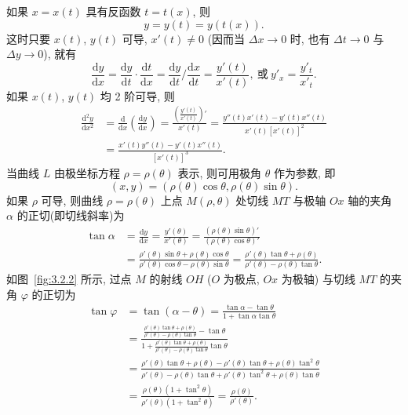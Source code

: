如果 $x = x(t)$ 具有反函数 $t = t(x)$, 则
\[
y = y(t) = y(t(x)).
\]
这时只要 $x(t)$, $y(t)$ 可导, $x'(t) \neq 0$ (因而当 $\Delta x \to 0$ 时, 也有 $\Delta t \to 0$ 与 $\Delta y \to 0$), 就有
\[
\frac{\mathrm{d}y}{\mathrm{d}x} = \frac{\mathrm{d}y}{\mathrm{d}t}\cdot\frac{\mathrm{d}t}{\mathrm{d}x} = \frac{\mathrm{d}y}{\mathrm{d}t}\bigg/\frac{\mathrm{d}x}{\mathrm{d}t} = \frac{y'(t)}{x'(t)},\ \text{或}\ y'_{x} = \frac{y'_{t}}{x'_{t}}.
\]
如果 $x(t)$, $y(t)$ 均 2 阶可导, 则
\[
\begin{aligned}
\frac{\mathrm{d}^{2}y}{\mathrm{d}x^{2}} &= \frac{\mathrm{d}}{\mathrm{d}x}\left(\frac{\mathrm{d}y}{\mathrm{d}x}\right) = \frac{\left(\frac{y'(t)}{x'(t)}\right)'}{x'(t)} = \frac{y''(t)x'(t) - y'(t)x''(t)}{x'(t)[x'(t)]^{2}}\\
&= \frac{x'(t)y''(t) - y'(t)x''(t)}{[x'(t)]^{3}}.
\end{aligned}
\]
当曲线 $L$ 由极坐标方程 $\rho = \rho(\theta)$ 表示, 则可用极角 $\theta$ 作为参数, 即
\[
(x, y) = (\rho(\theta)\cos\theta, \rho(\theta)\sin\theta).
\]
如果 $\rho$ 可导, 则曲线 $\rho = \rho(\theta)$ 上点 $M(\rho, \theta)$ 处切线 $MT$ 与极轴 $Ox$ 轴的夹角 $\alpha$ 的正切(即切线斜率)为
\[
\begin{aligned}
\tan\alpha &= \frac{\mathrm{d}y}{\mathrm{d}x} = \frac{y'(\theta)}{x'(\theta)} = \frac{(\rho(\theta)\sin\theta)'}{(\rho(\theta)\cos\theta)'}\\
&= \frac{\rho'(\theta)\sin\theta + \rho(\theta)\cos\theta}{\rho'(\theta)\cos\theta - \rho(\theta)\sin\theta} = \frac{\rho'(\theta)\tan\theta + \rho(\theta)}{\rho'(\theta) - \rho(\theta)\tan\theta}.
\end{aligned}
\]
如图~\ref{fig:3.2.2} 所示, 过点 $M$ 的射线 $OH$ ($O$ 为极点, $Ox$ 为极轴) 与切线 $MT$ 的夹角 $\varphi$ 的正切为
\[
\begin{aligned}
\tan\varphi &= \tan(\alpha - \theta) = \frac{\tan\alpha - \tan\theta}{1 + \tan\alpha\tan\theta}\\
&= \frac{\frac{\rho'(\theta)\tan\theta + \rho(\theta)}{\rho'(\theta) - \rho(\theta)\tan\theta} - \tan\theta}{1 + \frac{\rho'(\theta)\tan\theta + \rho(\theta)}{\rho'(\theta) - \rho(\theta)\tan\theta}\tan\theta}\\
&= \frac{\rho'(\theta)\tan\theta + \rho(\theta) - \rho'(\theta)\tan\theta + \rho(\theta)\tan^{2}\theta}{\rho'(\theta) - \rho(\theta)\tan\theta + \rho'(\theta)\tan^{2}\theta + \rho(\theta)\tan\theta}\\
&= \frac{\rho(\theta)(1 + \tan^{2}\theta)}{\rho'(\theta)(1 + \tan^{2}\theta)} = \frac{\rho(\theta)}{\rho'(\theta)}.
\end{aligned}
\]


